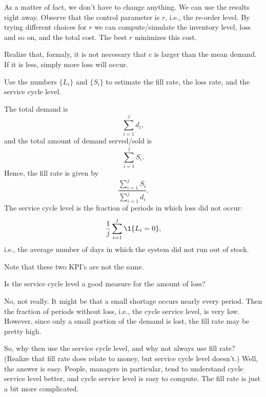   \begin{solution}
    As a matter of fact, we don't have to change anything. We can use
    the results right away. Observe that the control parameter is $r$,
    i.e., the re-order level. By trying different choices for $r$ we
    can compute/simulate the inventory level, loss and so on, and the
    total cost. The best $r$ minimizes this cost.

    Realize that, formaly, it is not necessary that $c$ is larger than
    the mean demand. If it is less, simply more loss will occur.
  \end{solution}


\begin{question}
  Use the numbers $\{L_i\}$ and $\{S_i\}$ to estimate the fill rate,
  the loss rate, and the service cycle level.
\end{question}

\begin{solution}
The total demand is
\begin{equation*}
 \sum_{i=1}^j d_i, 
\end{equation*}
and the total amount of demand served/sold is 
\begin{equation*}
 \sum_{i=1}^j S_i.
\end{equation*}
Hence, the fill rate is given by
\begin{equation*}
  \frac{\sum_{i=1}^j S_i}{\sum_{i=1}^j d_i}.
\end{equation*}
The service cycle level is the fraction of periods in which loss did not occur:
\begin{equation*}
  \frac 1 j \sum_{i=1}^j \1{L_i=0}, 
\end{equation*}
i.e., the average number of days in which the system did not run out of stock.

Note that these two KPI's are not the same. 
\end{solution}

\begin{question}
  Is the service cycle level a good measure for the  amount of loss?
\end{question}

  \begin{solution}
    No, not really. It might be that a small shortage occurs nearly
    every period. Then the fraction of periods without loss, i.e., the
    cycle service level, is very low. However, since only a small
    portion of the demand is lost, the fill rate may be pretty high. 

    So, why then use the service cycle level, and why not always use
    fill rate? (Realize that fill rate does relate to money, but
    service cycle level doesn't.) Well, the answer is easy. People,
    managers in particular, tend to understand cycle service level
    better, and cycle service level is easy to compute. The fill rate
    is just a bit more complicated. 
  \end{solution}


